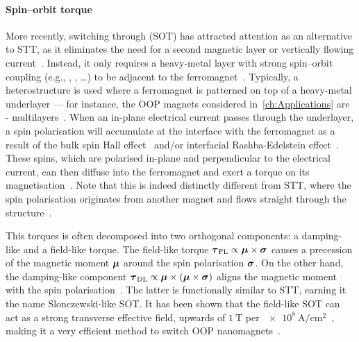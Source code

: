 \paragraph{Spin--orbit torque}
More recently, switching through  (SOT) has attracted attention as an alternative to STT, as it eliminates the need for a second magnetic layer or vertically flowing current~\cite{mumax3tutorial}.
Instead, it only requires a heavy-metal layer with strong spin--orbit coupling (e.g., , ,  \dots) to be adjacent to the ferromagnet~\cite{SOT_Roadmap}.
Typically, a heterostructure is used where a ferromagnet is patterned on top of a heavy-metal underlayer --- for instance, the OOP magnets considered in~\cref{ch:Applications} are - multilayers~\cite{KUR-24}. %
When an in-plane electrical current passes through the underlayer, a spin polarisation will accumulate at the interface with the ferromagnet as a result of the bulk spin Hall effect~\cite{SHE} and/or interfacial Rashba-Edelstein effect~\cite{SOT_Rashba}. %
These spins, which are polarised in-plane and perpendicular to the electrical current, can then diffuse into the ferromagnet and exert a torque on its magnetisation~\cite{mumax3tutorial}.
Note that this is indeed distinctly different from STT, where the spin polarisation originates from another magnet and flows straight through the structure~\cite{SOT_Roadmap}. \par
This torques is often decomposed into two orthogonal components: a damping-like and a field-like torque.
The field-like torque $\boldsymbol{\mathbf{\tau}}_\mathrm{FL} \propto \boldsymbol{\mathbf{\mu}} \times \boldsymbol{\mathbf{\sigma}}$ causes a precession of the magnetic moment $\boldsymbol{\mathbf{\mu}}$ around the spin polarisation $\boldsymbol{\mathbf{\sigma}}$.
On the other hand, the damping-like component $\boldsymbol{\mathbf{\tau}}_\mathrm{DL} \propto \boldsymbol{\mathbf{\mu}} \times (\boldsymbol{\mathbf{\mu}} \times \boldsymbol{\mathbf{\sigma}})$ aligns the magnetic moment with the spin polarisation~\cite{SOT_Roadmap,SOT_FM_AFM}.
The latter is functionally similar to STT, earning it the name Slonczewski-like SOT.
It has been shown that the field-like SOT can act as a strong transverse effective field, upwards of $\SI{1}{\tesla}$ per $\SI{e8}{\ampere\per\centi\metre\squared}$~\cite{SOT_Rashba}, making it a very efficient method to switch OOP nanomagnets~\cite{vlasov2022optimal,SOTswitchingCoPt,SHE_CurrentInducedSwitching,SpintronicsEnergyEfficientComputing}. \par
